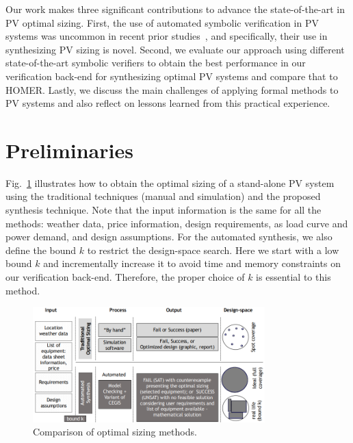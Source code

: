 \documentclass[runningheads]{llncs}
\begin{document}
Our work makes three significant contributions to advance the state-of-the-art in PV optimal sizing. First, the use of automated symbolic verification in PV systems was uncommon in recent prior studies~\cite{TrindadeCordeiro19}, and specifically, their use in synthesizing PV sizing is novel. Second, we evaluate our approach using different state-of-the-art symbolic verifiers to obtain the best performance in our verification back-end for synthesizing optimal PV systems and compare that to HOMER. Lastly, we discuss the main challenges of applying formal methods to PV systems and also reflect on lessons learned from this practical experience.

\vspace{-2ex}

\section{Preliminaries}
\label{sec:AutomatedVerification}

\vspace{-1ex}

Fig.~\ref{fig:optimization} illustrates how to obtain the optimal sizing of a stand-alone PV system using the traditional techniques (manual and simulation) and the proposed synthesis technique. Note that the input information is the same for all the methods: weather data, price information, design requirements, as load curve and power demand, and design assumptions. For the automated synthesis, we also define the bound $k$ to restrict the design-space search. Here we start with a low bound $k$ and incrementally increase it to avoid time and memory constraints on our verification back-end. Therefore, the proper choice of $k$ is essential to this method.

\begin{figure}[h]
\includegraphics[width=0.8\textwidth]{optimalsizingprocess4}
\centering
\caption{Comparison of optimal sizing methods.}
\label{fig:optimization}
\end{figure}
\end{document}
